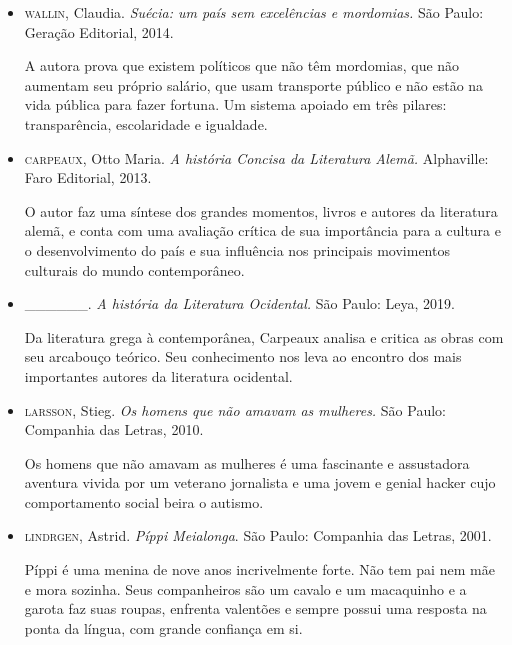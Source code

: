 \documentclass[12pt]{extarticle}
\begin{document}
\begin{itemize}
\item\textsc{wallin}, Claudia. \textit{Suécia: um país sem excelências e mordomias.}
São Paulo: Geração Editorial, 2014.

A autora prova que existem políticos que não têm mordomias, que não
aumentam seu próprio salário, que usam transporte público e não estão na
vida pública para fazer fortuna. Um sistema apoiado em três pilares:
transparência, escolaridade e igualdade.

\item\textsc{carpeaux}, Otto Maria. \textit{A história Concisa da Literatura Alemã.}
Alphaville: Faro Editorial, 2013.

O autor faz uma síntese dos grandes momentos, livros e autores da
literatura alemã, e conta com uma avaliação crítica de sua importância
para a cultura e o desenvolvimento do país e sua influência nos
principais movimentos culturais do mundo contemporâneo.

\item \_\_\_\_\_\_. \textit{A história da Literatura Ocidental.} São
Paulo: Leya, 2019.

Da literatura grega à contemporânea, Carpeaux analisa e critica as obras
com seu arcabouço teórico. Seu conhecimento nos leva ao encontro dos
mais importantes autores da literatura ocidental.

\item\textsc{larsson}, Stieg. \textit{Os homens que não amavam as mulheres.} São
Paulo: Companhia das Letras, 2010.

Os homens que não amavam as mulheres é uma fascinante e assustadora
aventura vivida por um veterano jornalista e uma jovem e genial hacker
cujo comportamento social beira o autismo.

\item\textsc{lindrgen}, Astrid. \textit{Píppi Meialonga}. São Paulo: Companhia das
Letras, 2001.

Píppi é uma menina de nove anos incrivelmente forte. Não tem pai nem mãe
e mora sozinha. Seus companheiros são um cavalo e um macaquinho e a
garota faz suas roupas, enfrenta valentões e sempre possui uma resposta
na ponta da língua, com grande confiança em si.
\end{itemize}
\end{document}

